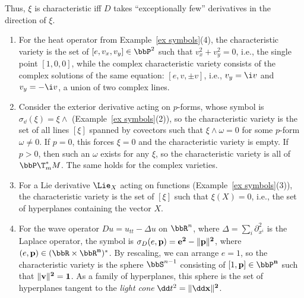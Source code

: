 Thus, $\xi$ is characteristic iff $D$ takes ``exceptionally few'' derivatives in the direction of $\xi$.

\begin{example}
    \begin{enumerate}
        \item For the heat operator from Example~\ref{ex symbols}(4), the characteristic variety is the set of $[e,v_x,v_y]\in\bbP^2$ such that $v_x^2+v_y^2=0$, i.e., the single point $[1,0,0]$, while the complex characteristic variety consists of the complex solutions of the same equation: $[e,v,\pm v]$, i.e., $v_y=\i v$ and $v_y=-\i v$, a union of two complex lines.
        \item Consider the exterior derivative acting on $p$-forms, whose symbol is $\sigma_{\dd}(\xi)=\xi\wedge$ (Example~\ref{ex symbols}(2)), so the characteristic variety is the set of all lines $[\xi]$ spanned by covectors such that $\xi\wedge\omega=0$ for some $p$-form $\omega\neq 0$. If $p=0$, this forces $\xi=0$ and the characteristic variety is empty. If $p>0$, then such an $\omega$ exists for any $\xi$, so the characteristic variety is all of $\bbP \T^\ast_m M$. The same holds for the complex varieties.
        \item For a Lie derivative $\Lie_X$ acting on functions (Example~\ref{ex symbols}(3)), the characteristic variety is the set of $[\xi]$ such that $\xi(X)=0$, i.e., the set of hyperplanes containing the vector $X$.
        \item For the wave operator $Du=u_{tt}-\Delta u$ on $\bbR^n$, where $\Delta=\sum_i \partial_{x^i}^2$ is the Laplace operator, the symbol is $\sigma_D(e,\bf{p})=e^2-\lVert\bf{p}\rVert^2$, where $(e,\bf{p})\in (\bbR\times\bbR^n)^\ast$. By rescaling, we can arrange $e=1$, so the characteristic variety is the sphere $\bbS^{n-1}$ consisting of $[1,\bf{p}]\in \bbP^n$ such that $\lVert\bf{v}\rVert^2=1$. As a family of hyperplanes, this sphere is the set of hyperplanes tangent to the \emph{light cone} $\dd t^2=\lVert\dd \bf{x}\rVert^2$.
    \end{enumerate}
\end{example}


